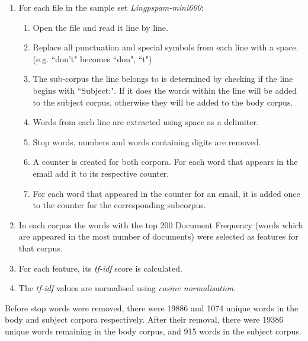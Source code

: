 \documentclass[10pt, a4paper]{article}
\begin{document}
\begin{enumerate}
\item For each file in the sample set \emph{Lingpspam-mini600}:
	\begin{enumerate}[label*=\arabic*.]
	\item Open the file and read it line by line.
	\item Replace all punctuation and special symbols from each line with a space. (e.g. ``don't" becomes ``don", ``t")
	\item The sub-corpus the line belongs to is determined by checking if the line begins with ``Subject:". If it does the words within the line will be added to the subject corpus, otherwise they will be added to the body corpus.
	\item Words from each line are extracted using space as a delimiter.
	\item Stop words, numbers and words containing digits are removed.
	\item A counter is created for both corpora. For each word that appears in the email add it to its respective counter.
	\item For each word that appeared in the counter for an email, it is added once to the counter for the corresponding subcorpus.
	\end{enumerate}
\item In each corpus the words with the top 200 Document Frequency (words which are appeared in the most number of documents) were selected as features for that corpus.
\item For each feature, its \emph{tf-idf} score is calculated.
\item The \emph{tf-idf} values are normalised using \emph{cosine normalisation}.
\end{enumerate}

Before stop words were removed, there were 19886 and 1074 unique words in the body and subject corpora respectively. After their removal, there were 19386 unique words remaining in the body corpus, and 915 words in the subject corpus.
\end{document}

